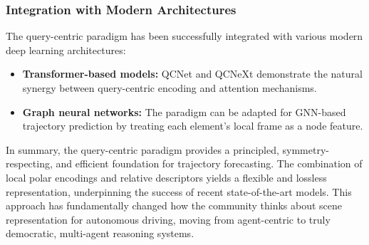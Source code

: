 \subsubsection*{Integration with Modern Architectures}
The query-centric paradigm has been successfully integrated with various modern deep learning architectures:

\begin{itemize}
    \item \textbf{Transformer-based models:} QCNet and QCNeXt demonstrate the natural synergy between query-centric encoding and attention mechanisms.
    \item \textbf{Graph neural networks:} The paradigm can be adapted for GNN-based trajectory prediction by treating each element's local frame as a node feature.
\end{itemize}

In summary, the query-centric paradigm provides a principled, symmetry-respecting, and efficient foundation for trajectory forecasting. The combination of local polar encodings and relative descriptors yields a flexible and lossless representation, underpinning the success of recent state-of-the-art models. This approach has fundamentally changed how the community thinks about scene representation for autonomous driving, moving from agent-centric to truly democratic, multi-agent reasoning systems.



\newpage